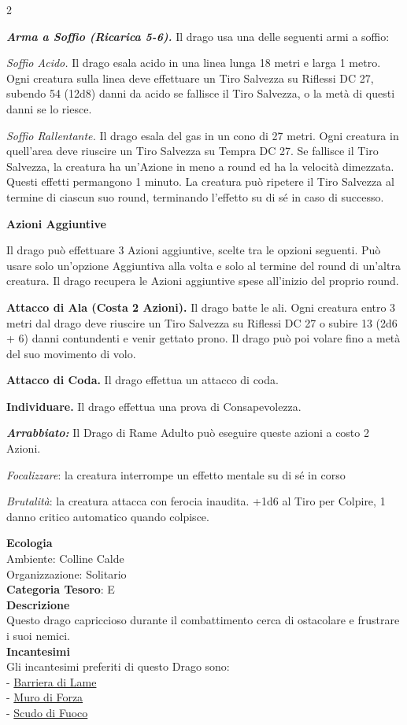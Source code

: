 \begin{multicols}{2}
{\emph{\textbf{Arma a Soffio (Ricarica 5-6).}} Il drago usa una delle seguenti armi a soffio:

\emph{Soffio Acido.} Il drago esala acido in una linea lunga 18 metri e larga 1 metro. Ogni creatura sulla linea deve effettuare un Tiro Salvezza su Riflessi DC 27, subendo 54 (12d8) danni da acido se fallisce il Tiro Salvezza, o la metà di questi danni se lo riesce.

\emph{Soffio Rallentante.} Il drago esala del gas in un cono di 27 metri. Ogni creatura in quell'area deve riuscire un Tiro Salvezza su Tempra DC 27. Se fallisce il Tiro Salvezza, la creatura ha un'Azione in meno a round ed ha la velocità dimezzata. Questi effetti permangono 1 minuto. La creatura può ripetere il Tiro Salvezza al termine di ciascun suo round, terminando l'effetto su di sé in caso di successo.

\textbf{Azioni Aggiuntive}

Il drago può effettuare 3 Azioni aggiuntive, scelte tra le opzioni seguenti. Può usare solo un'opzione Aggiuntiva alla volta e solo al termine del round di un'altra creatura. Il drago recupera le Azioni aggiuntive spese all'inizio del proprio round.

\textbf{Attacco di Ala (Costa 2 Azioni).} Il drago batte le ali. Ogni creatura entro 3 metri dal drago deve riuscire un Tiro Salvezza su Riflessi DC 27 o subire 13 (2d6 + 6) danni contundenti e venir gettato prono. Il drago può poi volare fino a metà del suo movimento di volo.

\textbf{Attacco di Coda.} Il drago effettua un attacco di coda.

\textbf{Individuare.} Il drago effettua una prova di Consapevolezza.

\emph{\textbf{Arrabbiato:}} Il Drago di Rame Adulto può eseguire queste azioni a costo 2 Azioni.

\emph{Focalizzare}: la creatura interrompe un effetto mentale su di sé in corso

\emph{Brutalità}: la creatura attacca con ferocia inaudita. +1d6 al Tiro per Colpire, 1 danno critico automatico quando colpisce.

\textbf{Ecologia}\\
Ambiente: Colline Calde\\
Organizzazione: Solitario\\
\textbf{Categoria Tesoro}: E\\
\textbf{Descrizione}\\
Questo drago capriccioso durante il combattimento cerca di ostacolare e frustrare i suoi nemici.\\
\textbf{Incantesimi}\\
Gli incantesimi preferiti di questo Drago sono:\\
- \hyperlink{Barriera di Lame}{Barriera di Lame}\\
- \hyperlink{Muro di Forza}{Muro di Forza}\\
- \hyperlink{Scudo di Fuoco}{Scudo di Fuoco}

}
\end{multicols}
